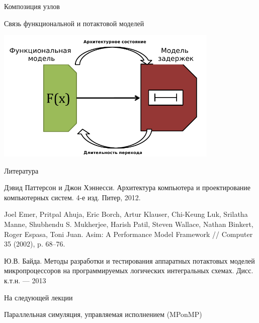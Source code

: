 \documentclass{beamer}
\begin{document}
\begin{frame}{Композиция узлов}

\centering


\end{frame}

\begin{frame}{Связь функциональной и потактовой моделей}

\centering\includegraphics[width=0.8\textwidth]{functional-cycle-precise-connection}

\end{frame}

% 


\begin{frame}[allowframebreaks]{Литература}
\begin{thebibliography}{99}
     Дэвид Паттерсон и Джон Хэннесси. Архитектура компьютера и проектирование компьютерных
систем. 4-е изд. Питер, 2012.

 Joel Emer, Pritpal Ahuja, Eric Borch, Artur Klauser, Chi-Keung Luk, Srilatha Manne, Shubhendu S. Mukherjee,
Harish Patil, Steven Wallace, Nathan Binkert, Roger Espasa, Toni Juan. Asim: A Performance Model Framework // Computer 35 (2002), p. 68–76.

 Ю.В. Байда. Методы разработки и тестирования аппаратных потактовых моделей микропроцессоров на программируемых логических интегральных схемах. Дисс. к.т.н. — 2013
\end{thebibliography}
\end{frame}

\begin{frame}{На следующей лекции}
\centering

Параллельная симуляция, управляемая исполнением (MPonMP)

\end{frame}
\end{document}

